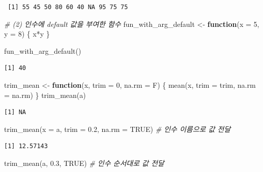 \documentclass[
  11pt,
]{krantz}
\newenvironment{Shaded}{\begin{snugshade}}{\end{snugshade}}
\newcommand{\AttributeTok}[1]{\textcolor[rgb]{0.61,0.61,0.61}{#1}}
\newcommand{\CommentTok}[1]{\textcolor[rgb]{0.37,0.37,0.37}{\textit{#1}}}
\newcommand{\ConstantTok}[1]{\textcolor[rgb]{0,0,0}{#1}}
\newcommand{\ControlFlowTok}[1]{\textcolor[rgb]{0.27,0.27,0.27}{\textbf{#1}}}
\newcommand{\DecValTok}[1]{\textcolor[rgb]{0.06,0.06,0.06}{#1}}
\newcommand{\FloatTok}[1]{\textcolor[rgb]{0.06,0.06,0.06}{#1}}
\newcommand{\FunctionTok}[1]{\textcolor[rgb]{0,0,0}{#1}}
\newcommand{\NormalTok}[1]{#1}
\newcommand{\OtherTok}[1]{\textcolor[rgb]{0.37,0.37,0.37}{#1}}
\newcommand{\SpecialCharTok}[1]{\textcolor[rgb]{0,0,0}{#1}}
\begin{document}
\begin{verbatim}
 [1] 55 45 50 80 60 40 NA 95 75 75
\end{verbatim}

\begin{Shaded}
\begin{Highlighting}[]
\CommentTok{\# (2) 인수에 default 값을 부여한 함수}
\NormalTok{fun\_with\_arg\_default }\OtherTok{\textless{}{-}} \ControlFlowTok{function}\NormalTok{(}\AttributeTok{x =} \DecValTok{5}\NormalTok{, }\AttributeTok{y =} \DecValTok{8}\NormalTok{) \{}
\NormalTok{  x}\SpecialCharTok{*}\NormalTok{y}
\NormalTok{\}}

\FunctionTok{fun\_with\_arg\_default}\NormalTok{()}
\end{Highlighting}
\end{Shaded}

\begin{verbatim}
[1] 40
\end{verbatim}

\begin{Shaded}
\begin{Highlighting}[]
\NormalTok{trim\_mean }\OtherTok{\textless{}{-}} \ControlFlowTok{function}\NormalTok{(x, }\AttributeTok{trim =} \DecValTok{0}\NormalTok{, }\AttributeTok{na.rm =}\NormalTok{ F) \{}
  \FunctionTok{mean}\NormalTok{(x, }\AttributeTok{trim =}\NormalTok{ trim, }\AttributeTok{na.rm =}\NormalTok{ na.rm)}
\NormalTok{\}}
\FunctionTok{trim\_mean}\NormalTok{(a)}
\end{Highlighting}
\end{Shaded}

\begin{verbatim}
[1] NA
\end{verbatim}

\begin{Shaded}
\begin{Highlighting}[]
\FunctionTok{trim\_mean}\NormalTok{(}\AttributeTok{x =}\NormalTok{ a, }\AttributeTok{trim =} \FloatTok{0.2}\NormalTok{, }\AttributeTok{na.rm =} \ConstantTok{TRUE}\NormalTok{) }\CommentTok{\# 인수 이름으로 값 전달}
\end{Highlighting}
\end{Shaded}

\begin{verbatim}
[1] 12.57143
\end{verbatim}

\begin{Shaded}
\begin{Highlighting}[]
\FunctionTok{trim\_mean}\NormalTok{(a, }\FloatTok{0.3}\NormalTok{, }\ConstantTok{TRUE}\NormalTok{)  }\CommentTok{\# 인수 순서대로 값 전달}
\end{Highlighting}
\end{Shaded}
\end{document}
